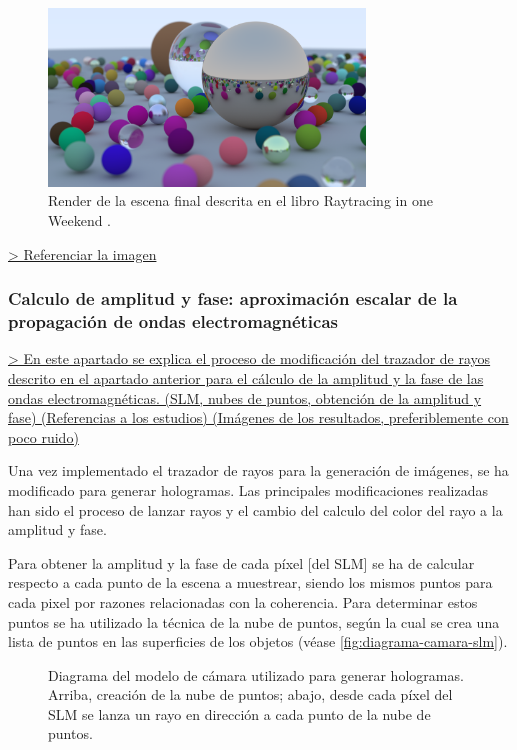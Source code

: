 \documentclass[10pt, a4paper]{article}
\begin{document}
\begin{figure}[H]
    \centering 
    \includegraphics[width=0.75\textwidth]{06_end_book_1}
    \caption{Render de la escena final descrita en el libro Raytracing in one Weekend \cite{Shirley:2024}.}
    \label{fig:render-final}
\end{figure}

\underline{> Referenciar la imagen}

\subsubsection{Calculo de amplitud y fase: aproximación escalar de la propagación de ondas electromagnéticas}

\underline{> En este apartado se explica el proceso de modificación del trazador de rayos descrito en el apartado anterior para el cálculo de la amplitud y la fase de las ondas electromagnéticas. (SLM, nubes de puntos, obtención de la amplitud y fase) (Referencias a los estudios) (Imágenes de los resultados, preferiblemente con poco ruido)}

Una vez implementado el trazador de rayos para la generación de imágenes, se ha modificado para generar hologramas. Las principales modificaciones realizadas han sido el proceso de lanzar rayos y el cambio del calculo del color del rayo a la amplitud y fase.

Para obtener la amplitud y la fase de cada píxel [del SLM] se ha de calcular respecto a cada punto de la escena a muestrear, siendo los mismos puntos para cada pixel por razones relacionadas con la coherencia. Para determinar estos puntos se ha utilizado la técnica de la nube de puntos, según la cual se crea una lista de puntos en las superficies de los objetos (véase \autoref{fig:diagrama-camara-slm}). 

\begin{figure}[H]
    \centering 
    
    \caption{Diagrama del modelo de cámara utilizado para generar hologramas. Arriba, creación de la nube de puntos; abajo, desde cada píxel del SLM se lanza un rayo en dirección a cada punto de la nube de puntos.}
    \label{fig:diagrama-camara-slm}
\end{figure}
\end{document}
